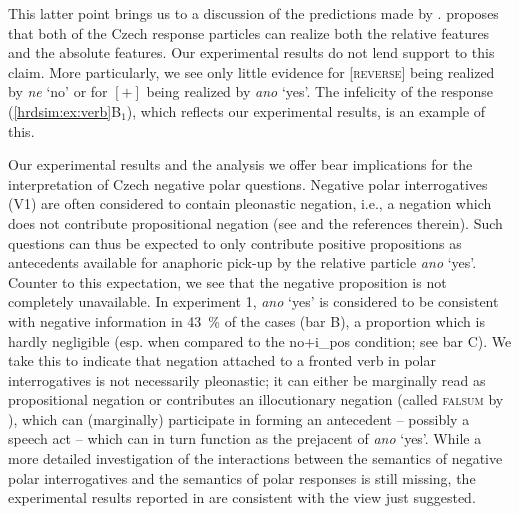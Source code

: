 \documentclass[output=paper,colorlinks,citecolor=brown]{langscibook}
\begin{document}
\noindent This latter point brings us to a discussion of the predictions made by \citet{gruet2016yes}. \citeauthor{Gruetskrabalova2015} proposes that both of the Czech response particles can realize both the relative features and the absolute features. Our experimental results do not lend support to this claim. More particularly, we see only little evidence for \textsc{[reverse]} being realized by \textit{ne} `no' or for $[+]$ being realized by \textit{ano} `yes'. The infelicity of the response (\ref{hrdsim:ex:verb}B$_1$), which reflects our experimental results, is an example of this.

Our experimental results and the analysis we offer bear implications for the interpretation of Czech negative polar questions. Negative polar interrogatives (V1) are often considered to contain pleonastic negation, i.e., a negation which does not contribute propositional negation (see \citealt{Stankova2023} and the references therein). Such questions can thus be expected to only contribute positive propositions as antecedents available for anaphoric pick-up by the relative particle \textit{ano} `yes'. Counter to this expectation, we see that the negative proposition is not completely unavailable. In experiment 1, \textit{ano} `yes' is considered to be consistent with negative information in \qty{43}{\percent} of the cases (bar B), a proportion which is hardly negligible (esp. when compared to the \textsf{no+i\_pos} condition; see bar C). We take this to indicate that negation attached to a fronted verb in polar interrogatives is not necessarily pleonastic; it can either be marginally read as propositional negation or contributes an illocutionary negation (called \textsc{falsum} by \citealt{hrd+:Repp2013}), which can (marginally) participate in forming an antecedent -- possibly a speech act -- which can in turn function as the prejacent of \textit{ano} `yes'. While a more detailed investigation of the interactions between the semantics of negative polar interrogatives and the semantics of polar responses is still missing, the experimental results reported in \citet{Stankova2023} are consistent with the view just suggested.
\end{document}
